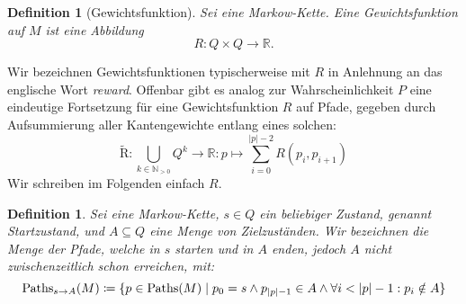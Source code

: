 \documentclass[a4paper]{article}
\newcommand{\mc}{Markow-Kette}
\newtheorem{definition}[satz]{Definition} %
\theoremstyle{nonumberplain}
\begin{document}
\newcommand{\reward}{Gewichtsfunktion}
\begin{definition}[\reward]
	Sei \mcex{} eine \mc{}. Eine \reward{} auf $M$ ist eine Abbildung
	\begin{equation}
	R : Q \times Q \to \mathbb{R}\text{.}
	\end{equation} 
\end{definition}
Wir bezeichnen Gewichtsfunktionen typischerweise mit $R$ in Anlehnung an das englische Wort \textit{reward}.
Offenbar gibt es analog zur Wahrscheinlichkeit $P$ eine eindeutige Fortsetzung für eine \reward{} $R$ auf Pfade, gegeben durch Aufsummierung aller Kantengewichte entlang eines solchen:
\begin{equation}
	\mathrm{\tilde{R}} : \bigcup_{k \in \mathbb{N}_{>0}}{Q^k} \to \mathbb{R} : p \mapsto \sum_{i = 0}^{|p| - 2}{R(p_i,p_{i+1})}
\end{equation}
Wir schreiben im Folgenden einfach $R$.
\begin{definition}\label{def-path-to}
	Sei \mcex{} eine \mc{}, $s \in Q$ ein beliebiger Zustand, genannt Startzustand, und $A \subseteq Q$ eine Menge von Zielzuständen. Wir bezeichnen die Menge der Pfade, welche in $s$ starten und in $A$ enden, jedoch $A$ nicht zwischenzeitlich schon erreichen, mit:
	\begin{equation}
		\mathrm{Paths}_{s \rightarrow A}(M) \coloneqq \{ p \in \mathrm{Paths}(M) \mid p_0 = s \land p_{|p|-1} \in A \land \forall i < |p| - 1 : p_i \notin A \}
	\end{equation}
	
\end{definition}
\end{document}
